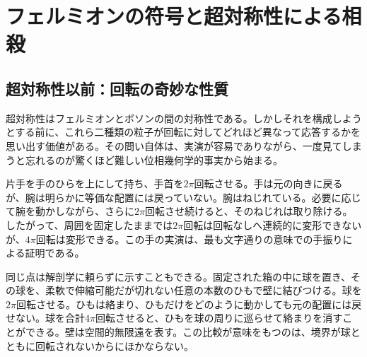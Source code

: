 \chapter{フェルミオンの符号と超対称性による相殺}


\section{超対称性以前：回転の奇妙な性質}

超対称性はフェルミオンとボソンの間の対称性である。しかしそれを構成しようとする前に、これら二種類の粒子が回転に対してどれほど異なって応答するかを思い出す価値がある。その問い自体は、実演が容易でありながら、一度見てしまうと忘れるのが驚くほど難しい位相幾何学的事実から始まる。

片手を手のひらを上にして持ち、手首を\(2\pi\)回転させる。手は元の向きに戻るが、腕は明らかに等価な配置には戻っていない。腕はねじれている。必要に応じて腕を動かしながら、さらに\(2\pi\)回転させ続けると、そのねじれは取り除ける。したがって、周囲を固定したままでは\(2\pi\)回転は回転なしへ連続的に変形できないが、\(4\pi\)回転は変形できる。この手の実演は、最も文字通りの意味での手振りによる証明である。

同じ点は解剖学に頼らずに示すこともできる。固定された箱の中に球を置き、その球を、柔軟で伸縮可能だが切れない任意の本数のひもで壁に結びつける。球を\(2\pi\)回転させる。ひもは絡まり、ひもだけをどのように動かしても元の配置には戻せない。球を合計\(4\pi\)回転させると、ひもを球の周りに巡らせて絡まりを消すことができる。壁は空間的無限遠を表す。この比較が意味をもつのは、境界が球とともに回転されないからにほかならない。

\begin{classroomqa}
\end{classroomqa}

